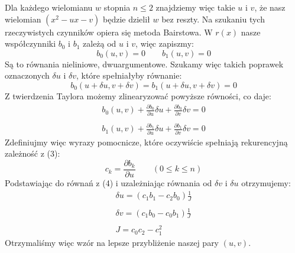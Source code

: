 \documentclass[a4paper]{article}
\begin{document}
    Dla każdego wielomianu $w$ stopnia $n \leq 2$ znajdziemy więc takie $u$ i $v$, że nasz wielomian $(x^2 - ux -v)$ będzie dzielił
    $w$ bez reszty. Na szukaniu tych rzeczywistych czynników opiera się metoda Bairstowa. W $r(x)$ nasze współczynniki $b_0$ i $b_1$
    zależą od $u$ i $v$, więc zapiszmy:
    \[
        b_0(u, v) = 0 \qquad b_1(u, v) = 0  
    \]
    Są to równania nieliniowe, dwuargumentowe. Szukamy więc takich poprawek oznaczonych $\delta u$ i $\delta v$, które spełniałyby równanie:
    \[
        b_0(u + \delta u, v + \delta v) = b_1(u + \delta u, v + \delta v) = 0  
    \]
    Z twierdzenia Taylora możemy zlinearyzować powyższe równości, co daje:
    \[
        \begin{array}{c}
            b_0(u, v) + \frac{\partial b_0}{\partial u}\delta u + \frac{\partial b_0}{\partial v}\delta v = 0  \\\\
            b_1(u, v) + \frac{\partial b_1}{\partial u}\delta u + \frac{\partial b_1}{\partial v}\delta v = 0  
        \end{array}
    \tag{4}\]
    Zdefiniujmy więc wyrazy pomocnicze, które oczywiście spełniają rekurencyjną zależność z (3):
    \[
        c_k = \frac{\partial b_k}{\partial u} \qquad (0 \leq k \leq n) 
    \]
    Podstawiając do równań z (4) i uzależniając równania od $\delta v$ i $\delta u$ otrzymujemy:
    \[
        \begin{array}{c}
            \delta u = (c_1b_1 - c_2b_0)\frac{1}{J} \\\\
            \delta v = (c_1b_0 - c_0b_1)\frac{1}{J} \\\\
            J = c_0c_2 - c_1^2
        \end{array}
    \]
    Otrzymaliśmy więc wzór na lepsze przybliżenie naszej pary $(u, v)$.

\newpage
\end{document}
